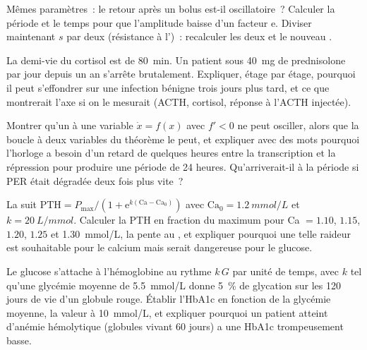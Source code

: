 \begin{exercise}[$\star\star$]\label{exo:b3:endocrinology:8}
Mêmes paramètres~: le retour après un bolus est-il oscillatoire~?
Calculer la période et le temps pour que l'amplitude baisse d'un facteur
$\mathrm{e}$. Diviser maintenant $s$ par deux (résistance à l')~:
recalculer les deux et le nouveau .
\end{exercise}

\begin{exercise}[$\star\star$]\label{exo:b3:endocrinology:9}
La demi-vie du cortisol est de \qty{80}{min}. Un patient sous
\qty{40}{mg} de prednisolone par jour depuis un an s'arrête brutalement.
Expliquer, étage par étage, pourquoi il peut s'effondrer sur une
infection bénigne trois jours plus tard, et ce que montrerait l'axe si
on le mesurait (ACTH, cortisol, réponse à l'ACTH injectée).
\end{exercise}

\begin{exercise}[$\star\star\star$]\label{exo:b3:endocrinology:10}
Montrer qu'un  à une variable $\dot x = f(x)$ avec
$f' < 0$ ne peut osciller, alors que la boucle à deux variables du
théorème le peut, et expliquer avec des mots pourquoi l'horloge a besoin
d'un retard de quelques heures entre la transcription et la répression
pour produire une période de 24 heures. Qu'arriverait-il à la période si
PER était dégradée deux fois plus vite~?
\end{exercise}

\begin{exercise}[$\star\star\star$]\label{exo:b3:endocrinology:11}
La  suit $\text{PTH} = P_{\max}/(1 +
\mathrm{e}^{k(\text{Ca} - \text{Ca}_{0})})$ avec $\text{Ca}_{0} =
\qty{1.2}{mmol/L}$ et $k = \qty{20}{L/mmol}$. Calculer la PTH en
fraction du maximum pour Ca $= 1.10$, $1.15$, $1.20$, $1.25$ et \qty{1.30}{mmol/L},
la pente au , et expliquer pourquoi une telle raideur
est souhaitable pour le calcium mais serait dangereuse pour le glucose.
\end{exercise}

\begin{exercise}[$\star\star\star$]\label{exo:b3:endocrinology:12}
Le glucose s'attache à l'hémoglobine au rythme $k\,G$ par unité de
temps, avec $k$ tel qu'une glycémie moyenne de \qty{5.5}{mmol/L} donne
\qty{5}{\%} de glycation sur les 120 jours de vie d'un globule rouge.
Établir l'HbA1c en fonction de la glycémie moyenne, la valeur à
\qty{10}{mmol/L}, et expliquer pourquoi un patient atteint d'anémie
hémolytique (globules vivant 60 jours) a une HbA1c trompeusement basse.
\end{exercise}

